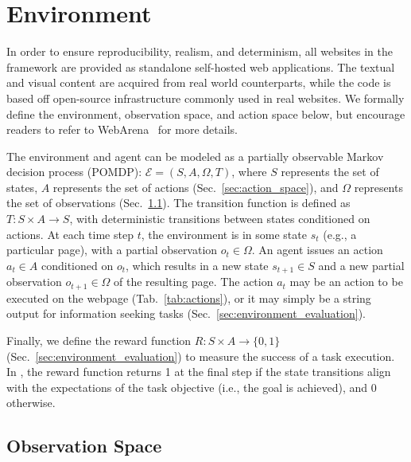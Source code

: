 \section{\BenchmarkName{} Environment} 

In order to ensure reproducibility, realism, and determinism, all websites in the \BenchmarkName{} framework are provided as standalone self-hosted web applications. The textual and visual content are acquired from real world counterparts, while the code is based off open-source infrastructure commonly used in real websites. We formally define the environment, observation space, and action space below, but encourage readers to refer to WebArena~\citep{zhou2023webarena} for more details.

The environment and agent can be modeled as a partially observable Markov decision process (POMDP): $\mathcal{E} = (S, A, \Omega, T)$, where $S$ represents the set of states, $A$ represents the set of actions (Sec.~\ref{sec:action_space}), and $\Omega$ represents the set of observations (Sec.~\ref{sec:observation_space}). The transition function is defined as $T: S \times A \rightarrow S$, with deterministic transitions between states conditioned on actions. At each time step $t$, the environment is in some state $s_t$ (e.g., a particular page), with a partial observation $o_t \in \Omega$. An agent issues an action $a_t \in A$ conditioned on $o_t$, which results in a new state $s_{t+1} \in S$ and a new partial observation $o_{t+1} \in \Omega$ of the resulting page. The action $a_t$ may be an action to be executed on the webpage (Tab.~\ref{tab:actions}), or it may simply be a string output for information seeking tasks (Sec.~\ref{sec:environment_evaluation}).

Finally, we define the reward function $R: S \times A \rightarrow \{0, 1\}$ (Sec.~\ref{sec:environment_evaluation}) to measure the success of a task execution. In \BenchmarkName{}, the reward function returns 1 at the final step if the state transitions align with the expectations of the task objective (i.e., the goal is achieved), and 0 otherwise. 

\subsection{Observation Space} \label{sec:observation_space}

